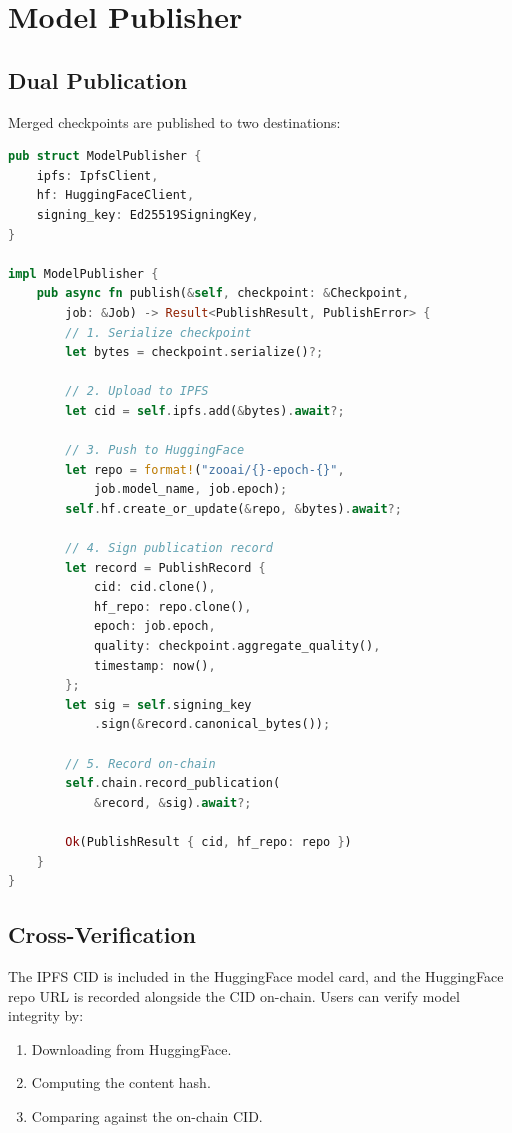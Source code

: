 \documentclass[11pt,letterpaper]{article}
\begin{document}
\section{Model Publisher}
\label{sec:publisher}

\subsection{Dual Publication}

Merged checkpoints are published to two destinations:

\begin{lstlisting}[language=Rust,caption=Model publication]
pub struct ModelPublisher {
    ipfs: IpfsClient,
    hf: HuggingFaceClient,
    signing_key: Ed25519SigningKey,
}

impl ModelPublisher {
    pub async fn publish(&self, checkpoint: &Checkpoint,
        job: &Job) -> Result<PublishResult, PublishError> {
        // 1. Serialize checkpoint
        let bytes = checkpoint.serialize()?;

        // 2. Upload to IPFS
        let cid = self.ipfs.add(&bytes).await?;

        // 3. Push to HuggingFace
        let repo = format!("zooai/{}-epoch-{}",
            job.model_name, job.epoch);
        self.hf.create_or_update(&repo, &bytes).await?;

        // 4. Sign publication record
        let record = PublishRecord {
            cid: cid.clone(),
            hf_repo: repo.clone(),
            epoch: job.epoch,
            quality: checkpoint.aggregate_quality(),
            timestamp: now(),
        };
        let sig = self.signing_key
            .sign(&record.canonical_bytes());

        // 5. Record on-chain
        self.chain.record_publication(
            &record, &sig).await?;

        Ok(PublishResult { cid, hf_repo: repo })
    }
}
\end{lstlisting}

\subsection{Cross-Verification}

The IPFS CID is included in the HuggingFace model card, and the HuggingFace repo URL is recorded alongside the CID on-chain.  Users can verify model integrity by:

\begin{enumerate}
    \item Downloading from HuggingFace.
    \item Computing the content hash.
    \item Comparing against the on-chain CID.
\end{enumerate}
\end{document}

